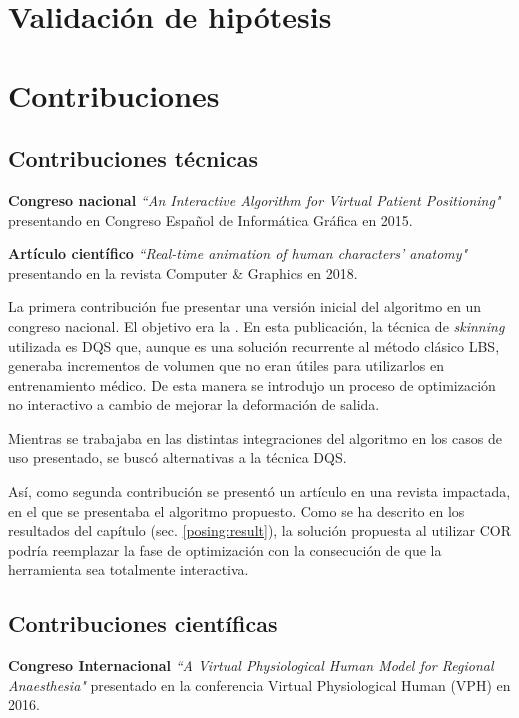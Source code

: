 \section{Validación de hipótesis}
\label{conclu:hipotesis}
\section{Contribuciones}
\subsection{Contribuciones técnicas}
\label{conclu:tecnica}

\textbf{Congreso nacional } \emph{``An Interactive Algorithm for Virtual Patient Positioning"} \cite{ceig.20151197} presentando en Congreso Español de Informática Gráfica en 2015. 

\textbf{Artículo científico }\emph{``Real-time animation of human characters' anatomy"}\cite{SUJAR2018268} presentando en la revista Computer \& Graphics en 2018. 

La primera contribución fue presentar una versión inicial del algoritmo en un congreso nacional. El objetivo era la .
En esta publicación, la técnica de \emph{skinning} utilizada es \ac{DQS} que, aunque es una solución recurrente al método clásico \ac{LBS}, generaba incrementos de volumen que no eran útiles para utilizarlos en entrenamiento médico. De esta manera se introdujo un proceso de optimización no interactivo a cambio de mejorar la deformación de salida.

Mientras se trabajaba en las distintas integraciones del algoritmo en los casos de uso presentado, se buscó alternativas a la técnica \ac{DQS}.

Así, como segunda contribución se presentó un artículo en una revista impactada, en el que se presentaba el algoritmo propuesto. Como se ha descrito en los resultados del capítulo (sec. \ref{posing:result}), la solución propuesta al utilizar \ac{COR} podría reemplazar la fase de optimización con la consecución de que la herramienta sea totalmente interactiva.





\subsection{Contribuciones científicas}
\label{conclu:cientifica}
\textbf{ Congreso Internacional }\emph{``A Virtual Physiological Human Model for Regional Anaesthesia"}\cite{VHZKLBSGSD16} presentado en la conferencia Virtual Physiological Human (VPH) en 2016.

